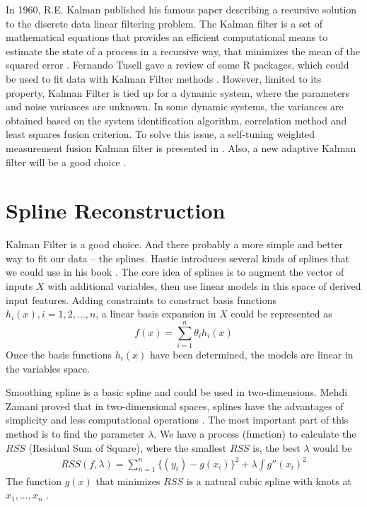 In 1960, R.E. Kalman published his famous paper describing a recursive solution to the discrete data linear filtering problem. The Kalman filter is a set of mathematical equations that provides an efficient computational means to estimate the state of a process in a recursive way, that minimizes the mean of the squared error \cite{introkalman}. Fernando Tusell gave a review of some R packages, which could be used to fit data with Kalman Filter methods \cite{kalmaninr}. However, limited to its property, Kalman Filter is tied up for a dynamic system, where the parameters and noise variances are unknown. In some dynamic systems, the variances are obtained based on the system identification algorithm, correlation method and least squares fusion criterion. To solve this issue, a self-tuning weighted measurement fusion Kalman filter is presented in \cite{selfturningkalman}. Also, a new adaptive Kalman filter will be a good choice \cite{adaptivekalman}. 






\section{Spline Reconstruction}



Kalman Filter is a good choice. And there probably a more simple and better way to fit our data -- the splines. Hastie introduces several kinds of splines that we could use in his book \cite{ESLII}. The core idea of splines is to augment the vector of inputs $X$ with additional variables, then use linear models in this space of derived input features. Adding constraints to construct basis functions $h_i(x), i = 1, 2,\ldots, n$, a linear basis expansion in $X$ could be represented as
\[ f(x)=\sum_{i=1}^n \theta_i h_i(x) \]
Once the basis functions $h_i(x)$ have been determined, the models are linear in the variables space. 

Smoothing spline is a basic spline and could be used in two-dimensions. Mehdi Zamani proved that in two-dimensional spaces, splines have the advantages of simplicity and less computational operations \cite{smoothsplinein2D}. The most important part of this method is to find the parameter $\lambda$. We have a process (function)  to calculate the $RSS$ (Residual Sum of Square), where the smallest $RSS$ is, the best $\lambda$ would be
\begin{align*}
RSS(f,\lambda)=\sum_{n=1}^{n}\{(y_i)-g(x_i)\}^2+\lambda\int g''(x_i)^2
\end{align*}
The function $g(x)$ that minimizes $RSS$ is a natural cubic spline with knots at $x_1,...,x_n$ \cite{ESLII}. 


